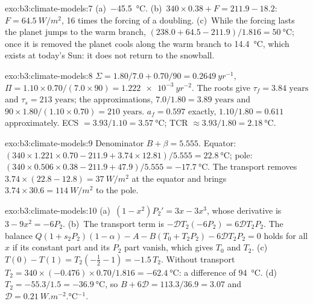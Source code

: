 \begin{solution}{exo:b3:climate-models:7}
(a)~\qty{-45.5}{\celsius}. (b)~$340\times0.38 + F = 211.9 - 18.2$: $F =
\qty{64.5}{W/m^2}$, 16 times the forcing of a doubling. (c)~While the
forcing lasts the planet jumps to the warm branch, $(238.0 + 64.5 -
211.9)/1.816 = \qty{50}{\celsius}$; once it is removed the planet cools
along the warm branch to \qty{14.4}{\celsius}, which exists at today's Sun:
it does not return to the snowball.
\end{solution}

\begin{solution}{exo:b3:climate-models:8}
$\Sigma = 1.80/7.0 + 0.70/90 = \qty{0.2649}{yr^{-1}}$, $\Pi = 1.10\times0.70/
(7.0\times90) = \qty{1.222e-3}{yr^{-2}}$. The roots give $\tau_f =
\num{3.84}\text{ years}$ and $\tau_s = \num{213}\text{ years}$; the approximations,
$7.0/1.80 = \num{3.89}\text{ years}$ and $90\times1.80/(1.10\times0.70) =
\num{210}\text{ years}$. $a_f = 0.597$ exactly, $1.10/1.80 = 0.611$
approximately. ECS $= 3.93/1.10 = \qty{3.57}{\celsius}$; TCR $\approx
3.93/1.80 = \qty{2.18}{\celsius}$.
\end{solution}

\begin{solution}{exo:b3:climate-models:9}
Denominator $B + \beta = \num{5.555}$. Equator: $(340\times1.221\times0.70 -
211.9 + 3.74\times12.81)/5.555 = \qty{22.8}{\celsius}$; pole:
$(340\times0.506\times0.38 - 211.9 + 47.9)/5.555 = \qty{-17.7}{\celsius}$.
The transport removes $3.74\times(22.8 - 12.8) = \qty{37}{W/m^2}$ at the
equator and brings $3.74\times30.6 = \qty{114}{W/m^2}$ to the pole.
\end{solution}

\begin{solution}{exo:b3:climate-models:10}
(a)~$(1 - x^2)P_2' = 3x - 3x^3$, whose derivative is $3 - 9x^2 = -6P_2$.
(b)~The transport term is $-\mathcal D T_2(-6P_2) = 6\mathcal DT_2P_2$.
The balance $Q(1 + s_2P_2)(1 - \alpha) - A - B(T_0 + T_2P_2) - 6\mathcal
DT_2P_2 = 0$ holds for all $x$ if its constant part and its $P_2$ part
vanish, which gives $T_0$ and $T_2$. (c)~$T(0) - T(1) = T_2(-\tfrac12 - 1)
= -1.5\,T_2$. Without transport $T_2 = 340\times(-0.476)\times0.70/1.816 =
\qty{-62.4}{\celsius}$: a difference of \qty{94}{\celsius}. (d)~$T_2 =
-55.3/1.5 = \qty{-36.9}{\celsius}$, so $B + 6\mathcal D = 113.3/36.9 =
3.07$ and $\mathcal D = \qty{0.21}{W.m^{-2}.\celsius^{-1}}$.
\end{solution}

